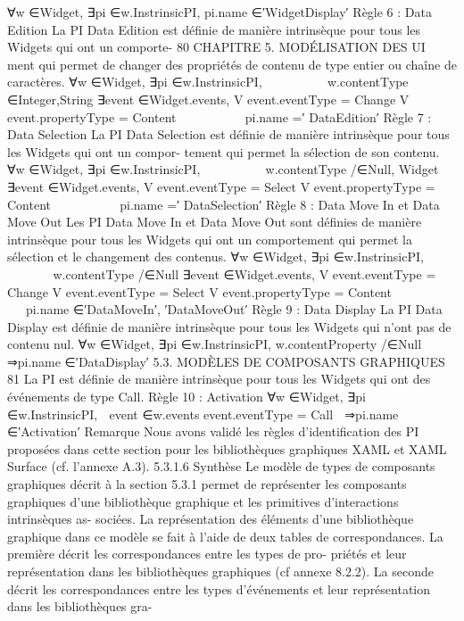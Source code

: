 \documentclass{article}
\begin{document}
∀w ∈{Widget}, ∃pi ∈w.InstrinsicPI,
pi.name ∈{′WidgetDisplay′}
Règle 6 : Data Edition
La PI Data Edition est déﬁnie de manière intrinsèque pour tous les Widgets qui ont un comporte-
80
CHAPITRE 5. MODÉLISATION DES UI
ment qui permet de changer des propriétés de contenu de type entier ou chaîne de caractères.
∀w ∈{Widget}, ∃pi ∈w.InstrinsicPI,








w.contentType ∈{Integer,String}
∃event ∈Widget.events,
V
event.eventType = Change
V
event.propertyType = Content








⇒pi.name =′ DataEdition′
Règle 7 : Data Selection
La PI Data Selection est déﬁnie de manière intrinsèque pour tous les Widgets qui ont un compor-
tement qui permet la sélection de son contenu.
∀w ∈{Widget}, ∃pi ∈w.InstrinsicPI,








w.contentType /∈{Null, Widget}
∃event ∈Widget.events,
V
event.eventType = Select
V
event.propertyType = Content








⇒pi.name =′ DataSelection′
Règle 8 : Data Move In et Data Move Out
Les PI Data Move In et Data Move Out sont déﬁnies de manière intrinsèque pour tous les Widgets
qui ont un comportement qui permet la sélection et le changement des contenus.
∀w ∈{Widget}, ∃pi ∈w.InstrinsicPI,










w.contentType /∈{Null}
∃event ∈Widget.events,
V
event.eventType = Change
V
event.eventType = Select V
event.propertyType = Content










⇒pi.name ∈{′DataMoveIn′, ′DataMoveOut′}
Règle 9 : Data Display
La PI Data Display est déﬁnie de manière intrinsèque pour tous les Widgets qui n’ont pas de
contenu nul.
∀w ∈{Widget}, ∃pi ∈w.InstrinsicPI,
w.contentProperty /∈{Null} ⇒pi.name ∈{′DataDisplay′}
5.3. MODÈLES DE COMPOSANTS GRAPHIQUES
81
La PI est déﬁnie de manière intrinsèque pour tous les Widgets qui ont des événements de type
Call.
Règle 10 : Activation
∀w ∈{Widget}, ∃pi ∈w.InstrinsicPI,

event ∈w.events
event.eventType = Call

⇒pi.name ∈{′Activation′}
Remarque
Nous avons validé les règles d’identiﬁcation des PI proposées dans cette section pour
les bibliothèques graphiques XAML et XAML Surface (cf. l’annexe A.3).
5.3.1.6
Synthèse
Le modèle de types de composants graphiques décrit à la section 5.3.1 permet de représenter les
composants graphiques d’une bibliothèque graphique et les primitives d’interactions intrinsèques as-
sociées. La représentation des éléments d’une bibliothèque graphique dans ce modèle se fait à l’aide
de deux tables de correspondances. La première décrit les correspondances entre les types de pro-
priétés et leur représentation dans les bibliothèques graphiques (cf annexe 8.2.2). La seconde décrit
les correspondances entre les types d’événements et leur représentation dans les bibliothèques gra-
\end{document}
